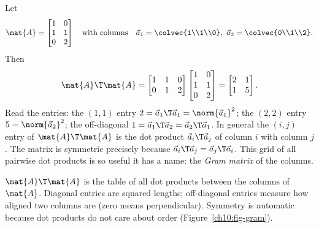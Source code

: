 \begin{example}\label{ch10:ex-ATA}
Let
\[
  \mat{A}=\begin{bmatrix} 1 & 0 \\ 1 & 1 \\ 0 & 2 \end{bmatrix}
  \quad\text{with columns}\quad
  \vec{a}_1=\colvec{1\\1\\0},\ \vec{a}_2=\colvec{0\\1\\2}.
\]
Then
\[
  \mat{A}\T\mat{A}
  = \begin{bmatrix} 1 & 1 & 0 \\ 0 & 1 & 2 \end{bmatrix}
    \begin{bmatrix} 1 & 0 \\ 1 & 1 \\ 0 & 2 \end{bmatrix}
  = \begin{bmatrix} 2 & 1 \\ 1 & 5 \end{bmatrix}.
\]
Read the entries: the $(1,1)$ entry $2=\vec{a}_1\T\vec{a}_1=\norm{\vec{a}_1}^2$; the $(2,2)$ entry
$5=\norm{\vec{a}_2}^2$; the off-diagonal $1=\vec{a}_1\T\vec{a}_2=\vec{a}_2\T\vec{a}_1$. In general the
$(i,j)$ entry of $\mat{A}\T\mat{A}$ is the dot product $\vec{a}_i\T\vec{a}_j$ of column $i$ with column
$j$. The matrix is symmetric precisely because $\vec{a}_i\T\vec{a}_j=\vec{a}_j\T\vec{a}_i$. This grid
of all pairwise dot products is so useful it has a name: the \emph{Gram matrix} of the columns.
\end{example}

\begin{focusbox}
$\mat{A}\T\mat{A}$ is the table of all dot products between the columns of $\mat{A}$. Diagonal entries
are squared lengths; off-diagonal entries measure how aligned two columns are (zero means
perpendicular). Symmetry is automatic because dot products do not care about order
(Figure~\ref{ch10:fig-gram}).
\end{focusbox}

